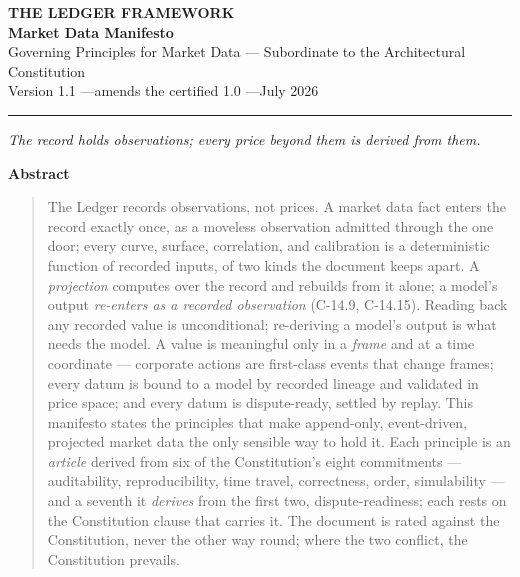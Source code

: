 \documentclass[11pt,a4paper]{article}
\begin{document}
\begin{center}
  {\LARGE\bfseries THE LEDGER FRAMEWORK}\\[0.9em]
  {\large\bfseries Market Data Manifesto}\\[0.6em]
  {\normalsize Governing Principles for Market Data ---
   Subordinate to the Architectural Constitution}\\[1.4em]
  Version 1.1 \quad---\quad amends the certified 1.0 \quad---\quad July 2026
\end{center}

\vspace{0.6em}
\begin{center}\rule{0.35\linewidth}{0.4pt}\end{center}
\vspace{0.6em}

\begin{center}\itshape
The record holds observations; every price beyond them is derived from them.
\end{center}

\vspace{0.4em}

\begin{center}\textbf{Abstract}\end{center}
\begin{quote}
The Ledger records observations, not prices. A market data fact enters
the record exactly once, as a moveless observation admitted through the
one door; every curve, surface, correlation, and calibration is a
deterministic function of recorded inputs, of two kinds the document
keeps apart. A \emph{projection} computes over the record and rebuilds
from it alone; a model's output \emph{re-enters as a recorded
observation} (C-14.9, C-14.15). Reading back any recorded value is
unconditional; re-deriving a model's output is what needs the model. A
value is meaningful only in a \emph{frame} and at a time coordinate ---
corporate actions are first-class events that change frames; every datum
is bound to a model by recorded lineage and validated in price space;
and every datum is dispute-ready, settled by replay. This manifesto
states the principles that make append-only, event-driven, projected
market data the only sensible way to hold it. Each principle is an
\emph{article} derived from six of the Constitution's eight commitments
--- auditability, reproducibility, time travel, correctness, order,
simulability --- and a seventh it \emph{derives} from the first two,
dispute-readiness; each rests on the Constitution clause that carries it.
The document is rated against the Constitution, never the other way round;
where the two conflict, the Constitution prevails.
\end{quote}
\end{document}
